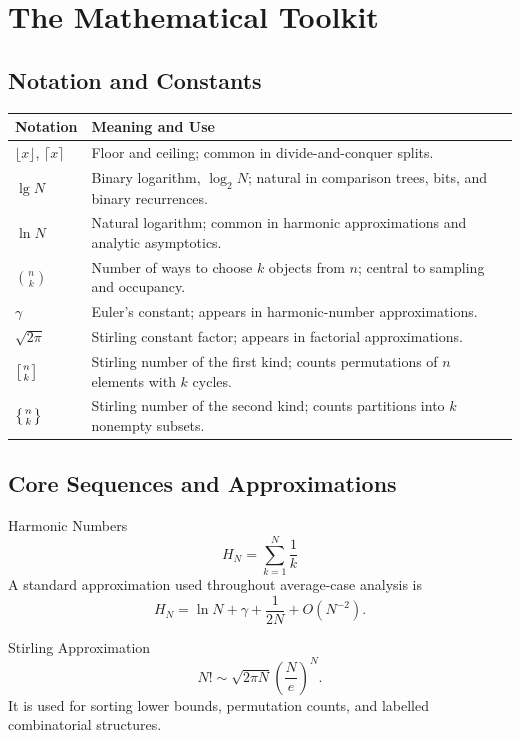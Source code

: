 \documentclass[11pt]{article}
\begin{document}
\section{The Mathematical Toolkit}

\subsection{Notation and Constants}

\begin{center}
\begin{tabularx}{\textwidth}{L{0.20\textwidth} Y}
\toprule
\textbf{Notation} & \textbf{Meaning and Use} \\
\midrule
\(\lfloor x\rfloor\), \(\lceil x\rceil\) & Floor and ceiling; common in divide-and-conquer splits. \\
\(\lg N\) & Binary logarithm, \(\log_2 N\); natural in comparison trees, bits, and binary recurrences. \\
\(\ln N\) & Natural logarithm; common in harmonic approximations and analytic asymptotics. \\
\(\binom{n}{k}\) & Number of ways to choose \(k\) objects from \(n\); central to sampling and occupancy. \\
\(\gamma\) & Euler's constant; appears in harmonic-number approximations. \\
\(\sqrt{2\pi}\) & Stirling constant factor; appears in factorial approximations. \\
\(\left[{n\atop k}\right]\) & Stirling number of the first kind; counts permutations of \(n\) elements with \(k\) cycles. \\
\(\left\{{n\atop k}\right\}\) & Stirling number of the second kind; counts partitions into \(k\) nonempty subsets. \\
\bottomrule
\end{tabularx}
\end{center}

\subsection{Core Sequences and Approximations}

\begin{mathbox}{Harmonic Numbers}
\[
H_N=\sum_{k=1}^{N}\frac{1}{k}
\]
A standard approximation used throughout average-case analysis is
\[
H_N = \ln N + \gamma + \frac{1}{2N}+O(N^{-2}).
\]
\end{mathbox}

\begin{mathbox}{Stirling Approximation}
\[
N! \sim \sqrt{2\pi N}\left(\frac{N}{e}\right)^N.
\]
It is used for sorting lower bounds, permutation counts, and labelled combinatorial structures.
\end{mathbox}
\end{document}
